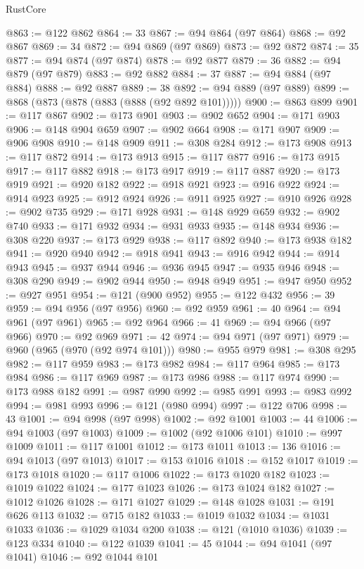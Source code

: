 \begin{lexlean}{RustCore}
\begin{coremodule}
@863 := @122 @862
@864 := 33
@867 := @94 @864 (@97 @864)
@868 := @92 @867
@869 := 34
@872 := @94 @869 (@97 @869)
@873 := @92 @872
@874 := 35
@877 := @94 @874 (@97 @874)
@878 := @92 @877
@879 := 36
@882 := @94 @879 (@97 @879)
@883 := @92 @882
@884 := 37
@887 := @94 @884 (@97 @884)
@888 := @92 @887
@889 := 38
@892 := @94 @889 (@97 @889)
@899 := @868 (@873 (@878 (@883 (@888 (@92 @892 @101)))))
@900 := @863 @899
@901 := @117 @867
@902 := @173 @901
@903 := @902 @652
@904 := @171 @903
@906 := @148 @904 @659
@907 := @902 @664
@908 := @171 @907
@909 := @906 @908
@910 := @148 @909
@911 := @308 @284
@912 := @173 @908
@913 := @117 @872
@914 := @173 @913
@915 := @117 @877
@916 := @173 @915
@917 := @117 @882
@918 := @173 @917
@919 := @117 @887
@920 := @173 @919
@921 := @920 @182
@922 := @918 @921
@923 := @916 @922
@924 := @914 @923
@925 := @912 @924
@926 := @911 @925
@927 := @910 @926
@928 := @902 @735
@929 := @171 @928
@931 := @148 @929 @659
@932 := @902 @740
@933 := @171 @932
@934 := @931 @933
@935 := @148 @934
@936 := @308 @220
@937 := @173 @929
@938 := @117 @892
@940 := @173 @938 @182
@941 := @920 @940
@942 := @918 @941
@943 := @916 @942
@944 := @914 @943
@945 := @937 @944
@946 := @936 @945
@947 := @935 @946
@948 := @308 @290
@949 := @902 @944
@950 := @948 @949
@951 := @947 @950
@952 := @927 @951
@954 := @121 (@900 @952)
@955 := @122 @432
@956 := 39
@959 := @94 @956 (@97 @956)
@960 := @92 @959
@961 := 40
@964 := @94 @961 (@97 @961)
@965 := @92 @964
@966 := 41
@969 := @94 @966 (@97 @966)
@970 := @92 @969
@971 := 42
@974 := @94 @971 (@97 @971)
@979 := @960 (@965 (@970 (@92 @974 @101)))
@980 := @955 @979
@981 := @308 @295
@982 := @117 @959
@983 := @173 @982
@984 := @117 @964
@985 := @173 @984
@986 := @117 @969
@987 := @173 @986
@988 := @117 @974
@990 := @173 @988 @182
@991 := @987 @990
@992 := @985 @991
@993 := @983 @992
@994 := @981 @993
@996 := @121 (@980 @994)
@997 := @122 @706
@998 := 43
@1001 := @94 @998 (@97 @998)
@1002 := @92 @1001
@1003 := 44
@1006 := @94 @1003 (@97 @1003)
@1009 := @1002 (@92 @1006 @101)
@1010 := @997 @1009
@1011 := @117 @1001
@1012 := @173 @1011
@1013 := 136
@1016 := @94 @1013 (@97 @1013)
@1017 := @153 @1016
@1018 := @152 @1017
@1019 := @173 @1018
@1020 := @117 @1006
@1022 := @173 @1020 @182
@1023 := @1019 @1022
@1024 := @177 @1023
@1026 := @173 @1024 @182
@1027 := @1012 @1026
@1028 := @171 @1027
@1029 := @148 @1028
@1031 := @191 @626 @113
@1032 := @715 @182
@1033 := @1019 @1032
@1034 := @1031 @1033
@1036 := @1029 @1034 @200
@1038 := @121 (@1010 @1036)
@1039 := @123 @334
@1040 := @122 @1039
@1041 := 45
@1044 := @94 @1041 (@97 @1041)
@1046 := @92 @1044 @101

\end{coremodule}
\end{lexlean}
